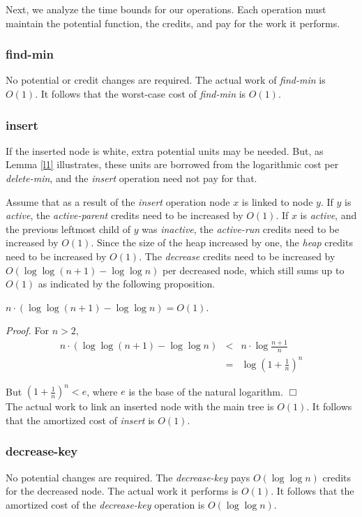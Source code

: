 Next, we analyze the time bounds for our operations. Each operation must maintain the potential function, the credits, and pay for the work it performs.

 
\subsubsection{find-min}
No potential or credit changes are required. The actual work of {\it find-min} is $O(1)$. It follows that the worst-case cost of {\it find-min} is $O(1)$.

\subsubsection{insert} 

If the inserted node is white, extra potential units may be needed. But, as Lemma \ref{l1} illustrates, these units are borrowed from the logarithmic cost per {\it delete-min}, and the {\it insert} operation need not pay for that. 

Assume that as a result of the {\it insert} operation node $x$ is linked to node $y$. If $y$ is {\it active}, the {\it active-parent} credits need to be increased by $O(1)$. If $x$ is {\it active}, and the previous leftmost child of $y$ was {\it inactive}, the {\it active-run} credits need to be increased by $O(1)$. Since the size of the heap increased by one, the {\it heap} credits need to be increased by $O(1)$. The {\it decrease} credits need to be increased by $O(\log \log (n+1) - \log \log{n})$ per decreased node, which still sums up to $O(1)$ as indicated by the following proposition.


\begin{prop}
$n \cdot (\log\log{(n+1)} - \log\log n) = O(1)$.
\end{prop}

{\it Proof.}
For $n>2$,
\begin{eqnarray*}
n \cdot (\log\log{(n+1)} - \log\log n) & < & n \cdot \log{\frac{n + 1}{n}} \\
& = & \log{(1+\frac{1}{n})^n}
\end{eqnarray*}

But $(1+\frac{1}{n})^{n} < e$, where $e$ is the base of the natural logarithm.
\hfill $\Box$ \\


The actual work to link an inserted node with the main tree is $O(1)$. It follows that the amortized cost of {\it insert} is $O(1)$.


\subsubsection{decrease-key}
No potential changes are required. The {\it decrease-key} pays $O(\log \log{n})$ credits for the decreased node. The actual work it performs is $O(1)$. It follows that the amortized cost of the {\it decrease-key} operation is $O(\log\log{n})$.


